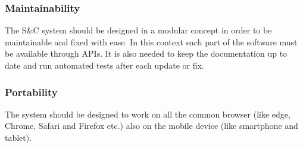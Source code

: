 \documentclass{article}
\begin{document}
\subsubsection{Maintainability}

The S\&C system should be designed in a modular concept in order to be maintainable and fixed with ease. In this context each part of the software must be available through APIs. It is also needed to keep the documentation up to date and run automated tests after each update or fix.

\subsubsection{Portability}

The system should be designed to work on all the common browser (like edge, Chrome, Safari and Firefox etc.) also on the mobile device (like smartphone and tablet).
\end{document}
